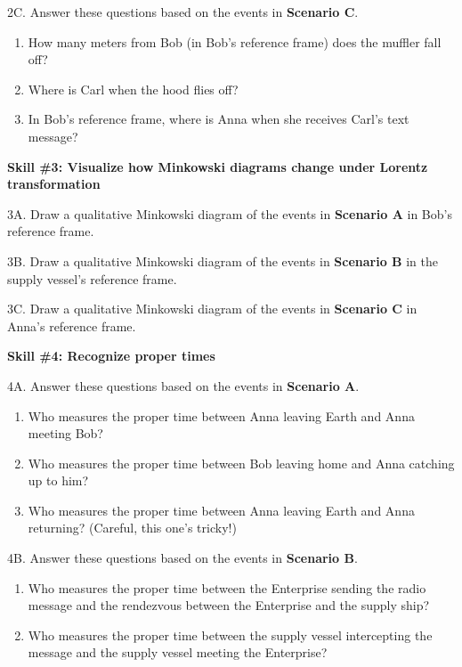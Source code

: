 2C. Answer these questions based on the events in \textbf{Scenario C}.
\begin{enumerate}[SkillBuilderParts]
\item How many meters from Bob (in Bob's reference frame) does the muffler fall off?
\answerspace{0.4in}

\item Where is Carl when the hood flies off?
\answerspace{0.4in}

\item In Bob's reference frame, where is Anna when she receives Carl's text message?
\answerspace{0.4in}
  
\end{enumerate}

\pagebreak

\textbf{Skill \#3: Visualize how Minkowski diagrams change under Lorentz transformation}

3A. Draw a qualitative Minkowski diagram of the events in \textbf{Scenario A} in Bob's reference frame.  
\bigskip

3B. Draw a qualitative Minkowski diagram of the events in \textbf{Scenario B} in the supply vessel's reference frame.  
\bigskip

3C. Draw a qualitative Minkowski diagram of the events in \textbf{Scenario C} in Anna's reference frame.  
\bigskip
\bigskip




\textbf{Skill \#4: Recognize proper times}

4A. Answer these questions based on the events in \textbf{Scenario A}.
\begin{enumerate}[SkillBuilderParts]
\item Who measures the proper time between Anna leaving Earth and Anna meeting Bob?
\answerspace{0.3in}

\item Who measures the proper time between Bob leaving home and Anna catching up to him? 
\answerspace{0.3in}

\item Who measures the proper time between Anna leaving Earth and Anna returning?  (Careful, this one's tricky!)
\answerspace{0.3in}

\end{enumerate}
4B. Answer these questions based on the events in \textbf{Scenario B}.
\begin{enumerate}[SkillBuilderParts]
\item Who measures the proper time between the Enterprise sending the radio message and the rendezvous between the Enterprise and the supply ship?
\answerspace{0.3in}

\item Who measures the proper time between the supply vessel intercepting the message and the supply vessel meeting the Enterprise?
\answerspace{0.3in}

\end{enumerate}

